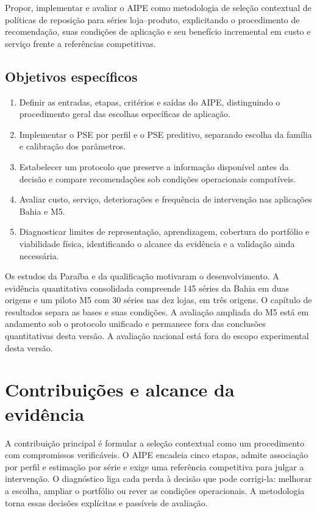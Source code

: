 Propor, implementar e avaliar o AIPE como metodologia de seleção contextual de políticas de reposição para séries loja--produto, explicitando o procedimento de recomendação, suas condições de aplicação e seu benefício incremental em custo e serviço frente a referências competitivas.

\subsection*{Objetivos específicos}

\begin{enumerate}
  \item Definir as entradas, etapas, critérios e saídas do AIPE, distinguindo o procedimento geral das escolhas específicas de aplicação.
  \item Implementar o PSE por perfil e o PSE preditivo, separando escolha da família e calibração dos parâmetros.
  \item Estabelecer um protocolo que preserve a informação disponível antes da decisão e compare recomendações sob condições operacionais compatíveis.
  \item Avaliar custo, serviço, deteriorações e frequência de intervenção nas aplicações Bahia e M5.
  \item Diagnosticar limites de representação, aprendizagem, cobertura do portfólio e viabilidade física, identificando o alcance da evidência e a validação ainda necessária.
\end{enumerate}

Os estudos da Paraíba e da qualificação motivaram o desenvolvimento. A evidência quantitativa consolidada compreende 145 séries da Bahia em duas origens e um piloto M5 com 30 séries nas dez lojas, em três origens. O capítulo de resultados separa as bases e suas condições. A avaliação ampliada do M5 está em andamento sob o protocolo unificado e permanece fora das conclusões quantitativas desta versão. A avaliação nacional está fora do escopo experimental desta versão.

\section{Contribuições e alcance da evidência}

A contribuição principal é formular a seleção contextual como um procedimento com compromissos verificáveis. O AIPE encadeia cinco etapas, admite associação por perfil e estimação por série e exige uma referência competitiva para julgar a intervenção. O diagnóstico liga cada perda à decisão que pode corrigi-la: melhorar a escolha, ampliar o portfólio ou rever as condições operacionais. A metodologia torna essas decisões explícitas e passíveis de avaliação.


